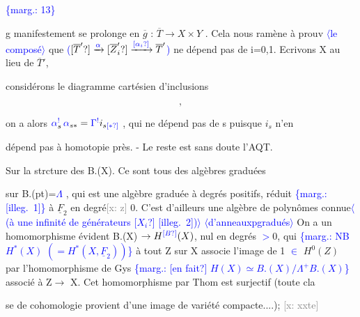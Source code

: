 \documentclass[11pt]{article}
\newcommand{\scanpage}[1]{\par\bigskip\noindent{\small\sffamily[scan #1]}\par}
\newcommand{\mspage}[1]{{\small\sffamily[p.\,#1]}}
\newcommand{\hand}[1]{\textcolor{blue}{#1}}
\newcommand{\inserted}[2][]{\textcolor{blue}{$\langle$#2$\rangle$}}
\newcommand{\margin}[1]{\textcolor{blue}{\{\textsf{marg.:} #1\}}}
\newcommand{\xout}[1]{\textcolor{gray}{[\textsf{x:} #1]}}
\newcommand{\unsure}[1]{[#1?]}
\newcommand{\illegible}[1]{[\textsf{illeg.\ #1}]}
\newenvironment{diagramblock}{\par\begin{center}}{\end{center}\par}
\begin{document}
\margin{13}

\clearpage
\scanpage{162-5/14}
\mspage{13}

g manifestement se prolonge en $\overline{g}$ : $\overline{T}\to X\times Y$ . Cela nous ramène à prouv
\inserted{le composé}
que \hand{(}$\unsure{\overline{T}'}\xrightarrow{\hand{\alpha}}\unsure{\overline{Z}'_i}\xrightarrow{\hand{\unsure{\alpha_i}}}\overline{T}'$\hand{)} ne dépend pas de i=0,1. Ecrivons X au lieu de $\overline{T}'$,

considérons le diagramme cartésien d'inclusions
\begin{diagramblock}\end{diagramblock}
\[ , \]

on a alors $\hand{\alpha}^{\hand{!}}_s\,\hand{\alpha}_{s*} = \hand{\Gamma}^{\hand{!}}i_{s\hand{\unsure{*}}}$ , qui ne dépend pas de s puisque $i_s$ n'en

dépend pas à homotopie près. - Le reste est sans doute l'AQT.

Sur la strcture des B.(X). Ce sont tous des algèbres graduées

sur B.(pt)=\hand{$\Lambda$} , qui est une algèbre graduée à degrés positifs, réduit
\margin{\illegible{1}}
à $\underline{F}_2$ en degré\xout{z} 0. C'est d'ailleurs une algèbre de polynômes connue\inserted{(à une infinité de générateurs \unsure{$X_i$} \illegible{2})}
\inserted[typed]{d'anneauxpgradués}
On a un homomorphisme évident B.(X) $\to H^{\hand{\unsure{B}}}(X)$, nul en degrés \hand{$>$}0, qui
\margin{NB $H^*(X)$ $(=H^*(X,\underline{F}_2))$}
à tout Z sur X associe l'image de 1 \hand{$\in$} $H^0(Z)$ par l'homomorphisme de Gys
\margin{\unsure{en fait} $H(X)\simeq B.(X)/\Lambda^+B.(X)$}
associé à Z$\to$ X. Cet homomorphisme par Thom est surjectif (toute cla

se de cohomologie provient d'une image de variété compacte....); \xout{xxte}
\end{document}
